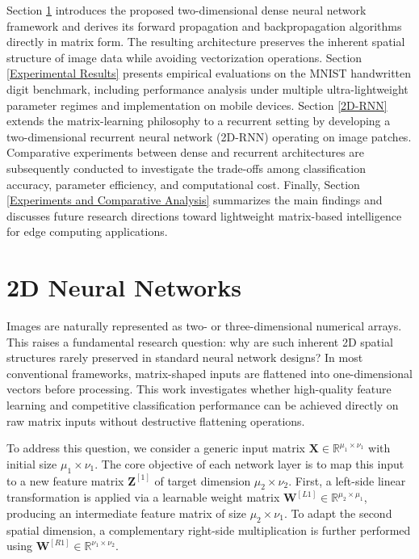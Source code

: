 \documentclass[pdflatex,sn-mathphys-num]{sn-jnl}%
\theoremstyle{thmstyleone}%
\theoremstyle{thmstyletwo}%
\theoremstyle{thmstylethree}%
\begin{document}
Section \ref{2D Neural Networks} introduces the proposed two-dimensional dense neural network framework and derives its forward propagation and backpropagation algorithms directly in matrix form. The resulting architecture preserves the inherent spatial structure of image data while avoiding vectorization operations. Section \ref{Experimental Results} presents empirical evaluations on the MNIST handwritten digit benchmark, including performance analysis under multiple ultra-lightweight parameter regimes and implementation on mobile devices. Section \ref{2D-RNN} extends the matrix-learning philosophy to a recurrent setting by developing a two-dimensional recurrent neural network (2D-RNN) operating on image patches. Comparative experiments between dense and recurrent architectures are subsequently conducted to investigate the trade-offs among classification accuracy, parameter efficiency, and computational cost. Finally, Section \ref{Experiments and Comparative Analysis} summarizes the main findings and discusses future research directions toward lightweight matrix-based intelligence for edge computing applications.
\section{2D Neural Networks}\label{2D Neural Networks}
Images are naturally represented as two- or three-dimensional numerical arrays. This raises a fundamental research question: why are such inherent 2D spatial structures rarely preserved in standard neural network designs? In most conventional frameworks, matrix-shaped inputs are flattened into one-dimensional vectors before processing. This work investigates whether high-quality feature learning and competitive classification performance can be achieved directly on raw matrix inputs without destructive flattening operations.

To address this question, we consider a generic input matrix $\boldsymbol{X} \in \mathbb{R}^{\mu_1 \times \nu_1}$ with initial size $\mu_1 \times \nu_1$. The core objective of each network layer is to map this input to a new feature matrix $\boldsymbol{Z}^{[1]}$ of target dimension $\mu_2 \times \nu_2$. First, a left-side linear transformation is applied via a learnable weight matrix $\boldsymbol{W}^{[L1]} \in \mathbb{R}^{\mu_2 \times \mu_1}$, producing an intermediate feature matrix of size $\mu_2 \times \nu_1$. To adapt the second spatial dimension, a complementary right-side multiplication is further performed using $\boldsymbol{W}^{[R1]} \in \mathbb{R}^{\nu_1 \times \nu_2}$.
\end{document}
